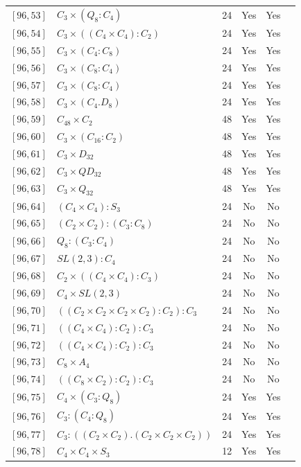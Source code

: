\documentclass[12pt, a4paper]{article}
\theoremstyle{plain}
\theoremstyle{definition}
\begin{document}
\begin{longtable}{llcccl}
  $[96,53]$ & $C_3 \times (Q_8 : C_4)$ & 24 & Yes & Yes \\
  $[96,54]$ & $C_3 \times ((C_4 \times C_4) : C_2)$ & 24 & Yes & Yes \\
  $[96,55]$ & $C_3 \times (C_4 : C_8)$ & 24 & Yes & Yes \\
  $[96,56]$ & $C_3 \times (C_8 : C_4)$ & 24 & Yes & Yes \\
  $[96,57]$ & $C_3 \times (C_8 : C_4)$ & 24 & Yes & Yes \\
  $[96,58]$ & $C_3 \times (C_4 . D_8)$ & 24 & Yes & Yes \\
  $[96,59]$ & $C_{48} \times C_2$ & 48 & Yes & Yes \\
  $[96,60]$ & $C_3 \times (C_{16} : C_2)$ & 48 & Yes & Yes \\
  $[96,61]$ & $C_3 \times D_{32}$ & 48 & Yes & Yes \\
  $[96,62]$ & $C_3 \times QD_{32}$ & 48 & Yes & Yes \\
  $[96,63]$ & $C_3 \times Q_{32}$ & 48 & Yes & Yes \\
  $[96,64]$ & $(C_4 \times C_4) : S_3$ & 24 & No & No \\
  $[96,65]$ & $(C_2 \times C_2) : (C_3 : C_8)$ & 24 & No & No \\
  $[96,66]$ & $Q_8 : (C_3 : C_4)$ & 24 & No & No \\
  $[96,67]$ & $SL(2,3) : C_4$ & 24 & No & No \\
  $[96,68]$ & $C_2 \times ((C_4 \times C_4) : C_3)$ & 24 & No & No \\
  $[96,69]$ & $C_4 \times SL(2,3)$ & 24 & No & No \\
  $[96,70]$ & $((C_2 \times C_2 \times C_2 \times C_2) : C_2) : C_3$ & 24 & No & No \\
  $[96,71]$ & $((C_4 \times C_4) : C_2) : C_3$ & 24 & No & No \\
  $[96,72]$ & $((C_4 \times C_4) : C_2) : C_3$ & 24 & No & No \\
  $[96,73]$ & $C_8 \times A_4$ & 24 & No & No \\
  $[96,74]$ & $((C_8 \times C_2) : C_2) : C_3$ & 24 & No & No \\
  $[96,75]$ & $C_4 \times (C_3 : Q_8)$ & 24 & Yes & Yes \\
  $[96,76]$ & $C_3 : (C_4 : Q_8)$ & 24 & Yes & Yes \\
  $[96,77]$ & $C_3 : ((C_2 \times C_2) . (C_2 \times C_2 \times C_2))$ & 24 & Yes & Yes \\
  $[96,78]$ & $C_4 \times C_4 \times S_3$ & 12 & Yes & Yes \\

\end{longtable}
\end{document}
